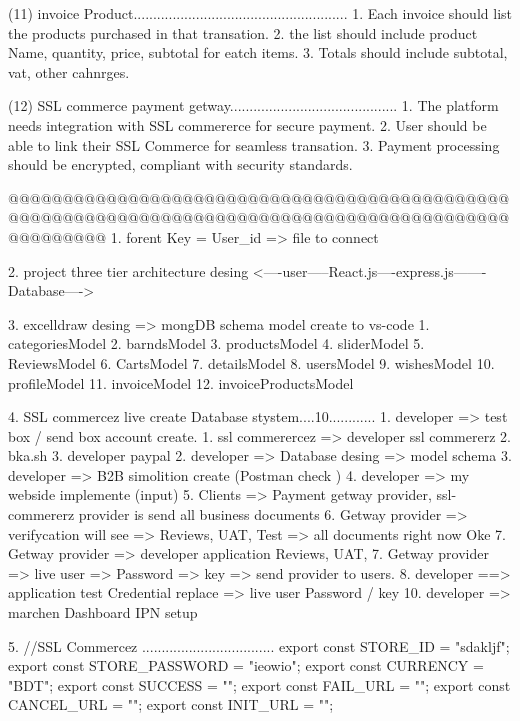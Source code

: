 (11) invoice Product.......................................................
     1. Each invoice should list the products purchased in that transation.
     2. the list should include product Name, quantity, price, subtotal for eatch items.
     3. Totals should include subtotal, vat, other cahnrges.

(12) SSL commerce payment getway...........................................
     1. The platform needs integration with SSL commererce for secure payment.
     2. User should be able to link their SSL Commerce for seamless transation.
     3. Payment processing should be encrypted, compliant with security standards.

@@@@@@@@@@@@@@@@@@@@@@@@@@@@@@@@@@@@@@@@@@@@@@@@@@@@@@@@@@@@@@@@@@@@@@@@@@@@@@@@@@@@@@@@@@@@@@@@@@@@@
1. forent Key = User_id => file to connect

2. project three tier architecture desing
   <----user-----React.js----express.js-------Database---->

3. excelldraw desing => mongDB schema model create to vs-code  
   1. categoriesModel
   2. barndsModel
   3. productsModel
   4. sliderModel
   5. ReviewsModel
   6. CartsModel
   7. detailsModel
   8. usersModel
   9. wishesModel
   10. profileModel
   11. invoiceModel
   12. invoiceProductsModel

4. SSL commercez live create Database stystem....10............
   1. developer =>  test box / send box account create.
      1. ssl commerercez => developer ssl commererz
      2. bka.sh 
      3. developer paypal 
   2. developer => Database desing => model schema
   3. developer => B2B simolition create (Postman check )
   4. developer => my webside  implemente (input)
   5. Clients => Payment getway provider, ssl-commererz provider is send all business documents 
   6. Getway provider => verifycation will see => Reviews, UAT, Test => all documents right now Oke
   7. Getway provider => developer application Reviews, UAT, 
   7. Getway provider => live user => Password => key => send provider to users.
   8. developer ==> application test Credential replace => live user Password / key 
   10. developer => marchen Dashboard IPN setup

5. //SSL Commercez ..................................
export const STORE_ID = "sdakljf";
export const STORE_PASSWORD = "ieowio";
export const CURRENCY = "BDT";
export const SUCCESS = "";
export const FAIL_URL = "";
export const CANCEL_URL = "";
export const INIT_URL = "";